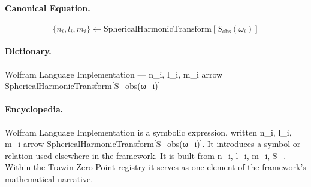 \paragraph{Canonical Equation.}
\[
\{n_i, l_i, m_i\} \leftarrow \text{SphericalHarmonicTransform}[S_{\text{obs}}(\omega_i)]
\]

\paragraph{Dictionary.}
Wolfram Language Implementation — n\_i, l\_i, m\_i arrow SphericalHarmonicTransform[S\_obs(ω\_i)]

\paragraph{Encyclopedia.}
Wolfram Language Implementation is a symbolic expression, written n\_i, l\_i, m\_i arrow SphericalHarmonicTransform[S\_obs(ω\_i)]. It introduces a symbol or relation used elsewhere in the framework. It is built from n\_i, l\_i, m\_i, S\_. Within the Trawin Zero Point registry it serves as one element of the framework's mathematical narrative.
